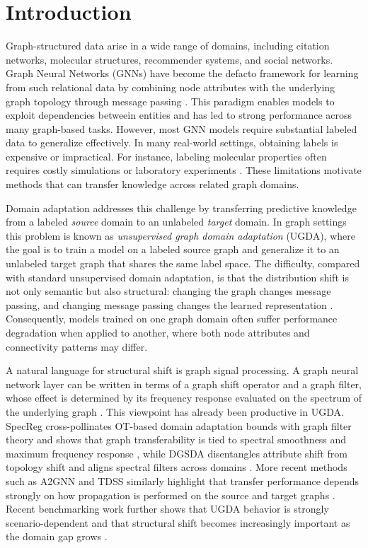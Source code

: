 \documentclass[runningheads]{llncs}
\begin{document}
\section{Introduction}

Graph-structured data arise in a wide range of domains, including citation networks, molecular structures, recommender systems, and social networks. Graph Neural Networks (GNNs) have become the defacto framework for learning from such relational data by combining node attributes with the underlying graph topology through message passing \cite{recsys,graph_tasks1,graph_tasks2,gcn}. This paradigm enables models to exploit dependencies betweein entities and has led to strong performance across many graph-based tasks. However, most GNN models require substantial labeled data to generalize effectively. In many real-world settings, obtaining labels is expensive or impractical. For instance, labeling molecular properties often requires costly simulations or laboratory experiments \cite{material_science,drug_discovery}. These limitations motivate methods that can transfer knowledge across related graph domains.


Domain adaptation addresses this challenge by transferring predictive knowledge from a labeled \emph{source} domain to an unlabeled \emph{target} domain. In graph settings this problem is known as \emph{unsupervised graph domain adaptation} (UGDA), where the goal is to train a model on a labeled source graph and generalize it to an unlabeled target graph that shares the same label space. The difficulty, compared with standard unsupervised domain adaptation, is that the distribution shift is not only semantic but also structural: changing the graph changes message passing, and changing message passing changes the learned representation \cite{gnn_stability}. Consequently, models trained on one graph domain often suffer performance degradation when applied to another, where both node attributes and connectivity patterns may differ.

A natural language for structural shift is graph signal processing. A graph neural network layer can be written in terms of a graph shift operator and a graph filter, whose effect is determined by its frequency response evaluated on the spectrum of the underlying graph \cite{shuman2013emerging,defferrard2016convolutional,gnn_stability}. This viewpoint has already been productive in UGDA. SpecReg cross-pollinates OT-based domain adaptation bounds with graph filter theory and shows that graph transferability is tied to spectral smoothness and maximum frequency response \cite{specreg}, while DGSDA disentangles attribute shift from topology shift and aligns spectral filters across domains \cite{dgsda}. More recent methods such as A2GNN and TDSS similarly highlight that transfer performance depends strongly on how propagation is performed on the source and target graphs \cite{a2gnn,tdss}. Recent benchmarking work further shows that UGDA behavior is strongly scenario-dependent and that structural shift becomes increasingly important as the domain gap grows \cite{pygda}.
\end{document}
